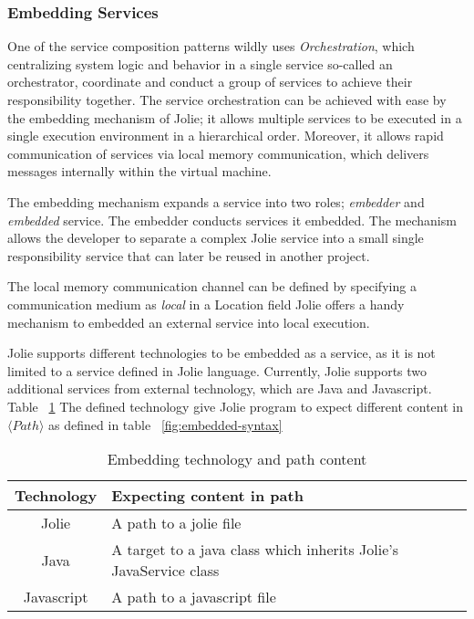 \subsubsection{Embedding Services}
\label{sec:embedded}

One of the service composition patterns wildly uses \textit{Orchestration}, which centralizing system logic and behavior in a single service so-called an orchestrator, coordinate and conduct a group of services to achieve their responsibility together. The service orchestration can be achieved with ease by the embedding mechanism of Jolie; it allows multiple services to be executed in a single execution environment in a hierarchical order.
Moreover, it allows rapid communication of services via local memory communication, which delivers messages internally within the virtual machine.

The embedding mechanism expands a service into two roles; \textit{embedder} and \textit{embedded} service. The embedder conducts services it embedded. The mechanism allows the developer to separate a complex Jolie service into a small single responsibility service that can later be reused in another project. 

The local memory communication channel can be defined by specifying a communication medium as \textit{local} in a Location field
Jolie offers a handy mechanism to embedded an external service into local execution. 

Jolie supports different technologies to be embedded as a service, as it is not limited to a service defined in Jolie language. Currently, Jolie supports two additional services from external technology, which are Java and Javascript. Table ~\ref{table:embedded-technology-path} The defined technology give Jolie program to expect different content in \(\langle Path \rangle\) as defined in table ~\ref{fig:embedded-syntax}

\begin{table}[h]
    \centering
    \begin{tabular}{ |c|l| }
        \hline
        Technology & Expecting content in path                                         \\
        \hline
        Jolie      & A path to a jolie file                                            \\
        Java       & A target to a java class which inherits Jolie's JavaService class \\
        Javascript & A path to a javascript file                                       \\
        \hline
    \end{tabular}
    \caption{Embedding technology and path content}
    \label{table:embedded-technology-path}
\end{table}


